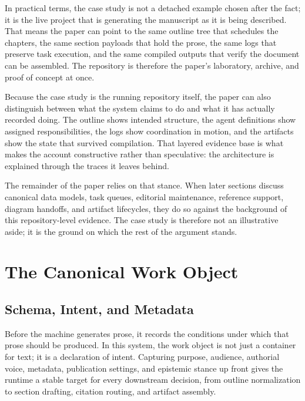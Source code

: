 \documentclass[11pt]{article}
\begin{document}
In practical terms, the case study is not a detached example chosen after the fact; it is the live project that is generating the manuscript as it is being described. That means the paper can point to the same outline tree that schedules the chapters, the same section payloads that hold the prose, the same logs that preserve task execution, and the same compiled outputs that verify the document can be assembled. The repository is therefore the paper's laboratory, archive, and proof of concept at once.

Because the case study is the running repository itself, the paper can also distinguish between what the system claims to do and what it has actually recorded doing. The outline shows intended structure, the agent definitions show assigned responsibilities, the logs show coordination in motion, and the artifacts show the state that survived compilation. That layered evidence base is what makes the account constructive rather than speculative: the architecture is explained through the traces it leaves behind.

The remainder of the paper relies on that stance. When later sections discuss canonical data models, task queues, editorial maintenance, reference support, diagram handoffs, and artifact lifecycles, they do so against the background of this repository-level evidence. The case study is therefore not an illustrative aside; it is the ground on which the rest of the argument stands.



\section{The Canonical Work Object}

\subsection{Schema, Intent, and Metadata}


Before the machine generates prose, it records the conditions under which that prose should be produced. In this system, the work object is not just a container for text; it is a declaration of intent. Capturing purpose, audience, authorial voice, metadata, publication settings, and epistemic stance up front gives the runtime a stable target for every downstream decision, from outline normalization to section drafting, citation routing, and artifact assembly.
\end{document}

